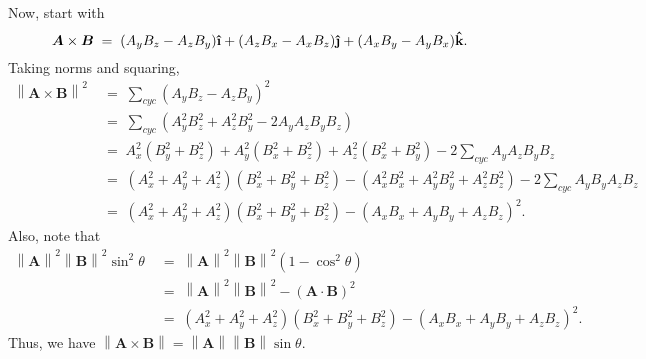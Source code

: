 \documentclass[10pt]{article}
\let\vec\boldsymbol
\newcommand{\uveci}{{\bm{\hat{\textnormal{\bfseries\i}}}}}
\newcommand{\uvecj}{{\bm{\hat{\textnormal{\bfseries\j}}}}}
\newcommand{\uveck}{{\bm{\hat{\textnormal{\bfseries k}}}}}
\newcommand\norm[1]{\left\lVert#1\right\rVert}
\begin{document}
        Now, start with
        \[
                \vec{A}\times\vec{B} \;=\; (A_yB_z - A_zB_y)\uveci + (A_zB_x - A_xB_z)\uvecj + (A_xB_y - A_y B_x)\uveck. \\
        \]
        Taking norms and squaring,
        \begin{align*}
                \norm{\vec{A}\times\vec{B}}^2 \;&=\; \sum_{cyc} (A_yB_z - A_zB_y)^2 \\
                        \;&=\; \sum_{cyc} (A_y^2B_z^2 + A_z^2B_y^2 - 2A_yA_zB_yB_z) \\
                        \;&=\; A_x^2(B_y^2 + B_z^2) + A_y^2(B_x^2 + B_z^2) + A_z^2(B_x^2 + B_y^2) - 2\sum_{cyc} A_yA_zB_yB_z \\
                        \;&=\; (A_x^2 + A_y^2 + A_z^2)(B_x^2 + B_y^2 + B_z^2) - (A_x^2B_x^2 + A_y^2B_y^2 + A_z^2B_z^2) - 2\sum_{cyc} A_yB_yA_zB_z \\
                        \;&=\; (A_x^2 + A_y^2 + A_z^2)(B_x^2 + B_y^2 + B_z^2) - (A_xB_x + A_yB_y + A_zB_z)^2.
        \end{align*}
        Also, note that
        \begin{align*}
                \norm{\vec{A}}^2\norm{\vec{B}}^2\sin^2\theta \;&=\; \norm{\vec{A}}^2\norm{\vec{B}}^2 (1 - \cos^2\theta) \\
                        \;&=\; \norm{\vec{A}}^2\norm{\vec{B}}^2 - (\vec{A}\cdot\vec{B})^2 \\
                        \;&=\; (A_x^2 + A_y^2 + A_z^2)(B_x^2 + B_y^2 + B_z^2) - (A_xB_x + A_yB_y + A_zB_z)^2.
        \end{align*}
        Thus, we have $\norm{\vec{A}\times\vec{B}} = \norm{\vec{A}}\norm{\vec{B}}\sin\theta$.
\end{document}
